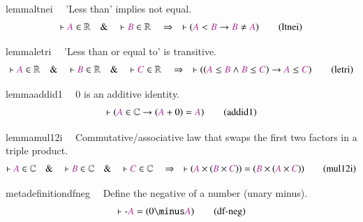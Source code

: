 \begin{restatable}{lemma}{ltnei}~~ 'Less than' implies not equal. 
\begin{align}
\vdash \mc{A} \in \mathbb{R}\quad\&\quad \vdash \mc{B} \in
    \mathbb{R}\quad\Rightarrow\quad \vdash ( \mc{A} < \mc{B} \rightarrow \mc{B}
    \ne \mc{A} )\label{eq:ltnei}\tag{ltnei}
\end{align}
\end{restatable}

\begin{restatable}{lemma}{letri}~~ 'Less than or equal to' is transitive. 
~
\begin{align}
\vdash \mc{A} \in \mathbb{R}\quad\&\quad \vdash \mc{B} \in
    \mathbb{R}\quad\&\quad \vdash \mc{C} \in \mathbb{R}\quad\Rightarrow\quad
    \vdash ( ( \mc{A} \le \mc{B} \wedge \mc{B} \le \mc{C} ) \rightarrow \mc{A}
    \le \mc{C} )\label{eq:letri}\tag{letri}
\end{align}
\end{restatable}

\begin{restatable}{lemma}{addid1}~~ $0$ is an additive identity.  
       ~
\begin{align}
\vdash ( \mc{A} \in \mathbb{C} \rightarrow ( \mc{A} + 0 ) = \mc{A}
    )\label{eq:addid1}\tag{addid1}
\end{align}
\end{restatable}

\begin{restatable}{lemma}{mul12i}~~ Commutative/associative law that swaps the
first two factors in a triple
       product.  ~  ~
\begin{align}
\vdash \mc{A} \in \mathbb{C}\quad\&\quad \vdash \mc{B} \in
    \mathbb{C}\quad\&\quad \vdash \mc{C} \in \mathbb{C}\quad\Rightarrow\quad
    \vdash ( \mc{A} \times ( \mc{B} \times \mc{C} ) ) = ( \mc{B} \times ( \mc{A}
    \times \mc{C} ) )\label{eq:mul12i}\tag{mul12i}
\end{align}
\end{restatable}

\begin{restatable}{metadefinition}{dfneg}~~ Define the negative of a number (unary
minus).  
\begin{align}
\vdash \textrm{-} \mc{A} = ( 0 \minus \mc{A} )\label{eq:df-neg}\tag{df-neg}
\end{align}
\end{restatable}

